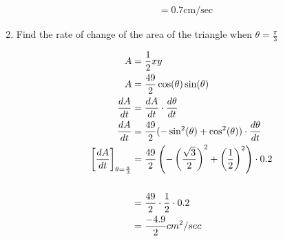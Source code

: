 \documentclass[nooutcomes]{ximera}
\begin{document}
\begin{problem}
\begin{enumerate}
\begin{freeResponse}
\begin{align*}
		&=0.7 \text{cm/sec}
		\end{align*}
				\end{freeResponse}
	\item Find the rate of change of the area of the triangle when $\theta=\frac{\pi}{3}$
		\begin{freeResponse}
		\begin{align*}
		A&=\frac{1}{2}xy\\
		A&=\frac{49}{2}\cos(\theta)\sin(\theta)\\
		\frac{dA}{dt}&=\frac{dA}{dt} \cdot \frac{d\theta}{dt}\\
		\frac{dA}{dt}&=\frac{49}{2}(-\sin^2(\theta)+\cos^2(\theta)) \cdot \frac{d\theta}{dt}\\
		\bigg[ \frac{dA}{dt} \bigg]_{\theta=\frac{\pi}{3}}&=\frac{49}{2}\left(-\left(\frac{\sqrt{3}}{2}\right)^2+\left(\frac{1}{2}\right)^2 \right) \cdot 0.2\\\\
		&=\frac{49}{2}\cdot \frac{1}{2} \cdot 0.2\\
		&=\frac{-4.9}{2} cm^2/sec
		\end{align*}
		\end{freeResponse}
\end{enumerate}
\end{problem}
\end{document}
